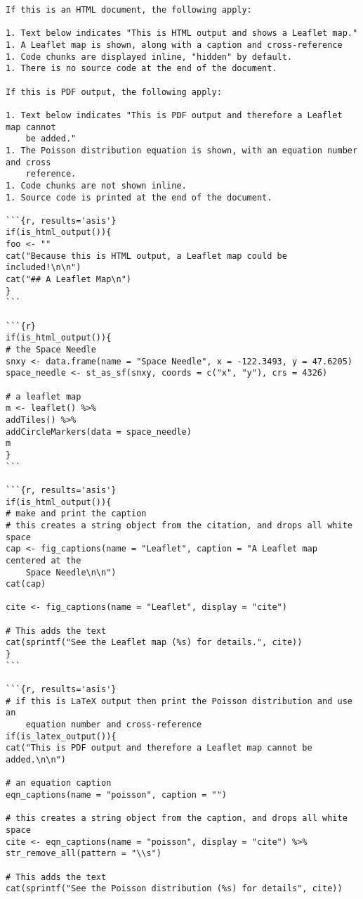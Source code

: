 \documentclass[
]{article}
\begin{document}
\begin{verbatim}
If this is an HTML document, the following apply:

1. Text below indicates "This is HTML output and shows a Leaflet map."
1. A Leaflet map is shown, along with a caption and cross-reference
1. Code chunks are displayed inline, "hidden" by default.
1. There is no source code at the end of the document.

If this is PDF output, the following apply:

1. Text below indicates "This is PDF output and therefore a Leaflet map cannot
    be added."
1. The Poisson distribution equation is shown, with an equation number and cross
    reference.
1. Code chunks are not shown inline.
1. Source code is printed at the end of the document.

```{r, results='asis'}
if(is_html_output()){
foo <- ""
cat("Because this is HTML output, a Leaflet map could be included!\n\n")
cat("## A Leaflet Map\n")
}
```

```{r}
if(is_html_output()){
# the Space Needle
snxy <- data.frame(name = "Space Needle", x = -122.3493, y = 47.6205)
space_needle <- st_as_sf(snxy, coords = c("x", "y"), crs = 4326)

# a leaflet map
m <- leaflet() %>%
addTiles() %>%
addCircleMarkers(data = space_needle)
m
}
```

```{r, results='asis'}
if(is_html_output()){
# make and print the caption
# this creates a string object from the citation, and drops all white space
cap <- fig_captions(name = "Leaflet", caption = "A Leaflet map centered at the
    Space Needle\n\n")
cat(cap)

cite <- fig_captions(name = "Leaflet", display = "cite")

# This adds the text
cat(sprintf("See the Leaflet map (%s) for details.", cite))
}
```

```{r, results='asis'}
# if this is LaTeX output then print the Poisson distribution and use an
    equation number and cross-reference
if(is_latex_output()){
cat("This is PDF output and therefore a Leaflet map cannot be added.\n\n")

# an equation caption
eqn_captions(name = "poisson", caption = "")

# this creates a string object from the caption, and drops all white space
cite <- eqn_captions(name = "poisson", display = "cite") %>%
str_remove_all(pattern = "\\s")

# This adds the text
cat(sprintf("See the Poisson distribution (%s) for details", cite))


\end{verbatim}
\end{document}
